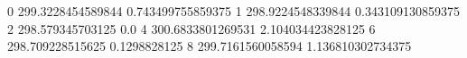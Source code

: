 0 299.3228454589844 0.743499755859375
1 298.9224548339844 0.343109130859375
2 298.579345703125 0.0
4 300.6833801269531 2.104034423828125
6 298.709228515625 0.1298828125
8 299.7161560058594 1.136810302734375

